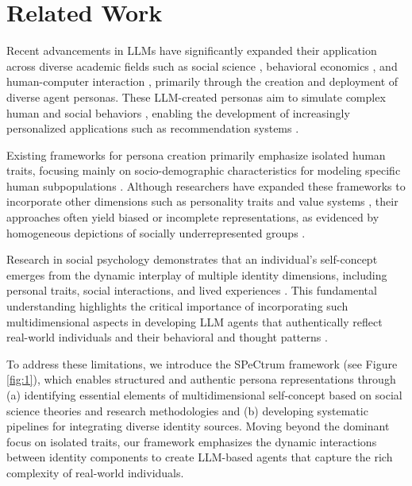 \section{Related Work}
Recent advancements in LLMs have significantly expanded their application across diverse academic fields such as social science \citep{aher_using_2023, gao_s3_2023}, behavioral economics \citep{horton_large_2023}, and human-computer interaction \citep{hamalainen_evaluating_2023}, primarily through the creation and deployment of diverse agent personas. These LLM-created personas aim to simulate complex human and social behaviors \citep{park_social_2022, park_generative_2023}, enabling the development of increasingly personalized applications such as recommendation systems \citep{wang_user_2023}.

Existing frameworks for persona creation primarily emphasize isolated human traits, focusing mainly on socio-demographic characteristics \citep{chen_empathy_2024, zhang_speechagents_2024, chuang-etal-2024-simulating} for modeling specific human subpopulations \citep{argyle_out_2023}. Although researchers have expanded these frameworks to incorporate other dimensions such as personality traits \citep{jiang-etal-2024-personallm, liu2024skepticism, xie_human_2024, yuan_evaluating_2024} and value systems \citep{zhou_sotopia_2024, xie2024largelanguagemodelagents, kang_values_2023}, their approaches often yield biased or incomplete representations, as evidenced by homogeneous depictions of socially underrepresented groups \citep{petrov_limited_2024, gupta_bias_2023, deusex_2024, cheng_compost_2023, lee_large_2024}.

Research in social psychology demonstrates that an individual's self-concept emerges from the dynamic interplay of multiple identity dimensions, including personal traits, social interactions, and lived experiences \citep{mead1934mind}. This fundamental understanding highlights the critical importance of incorporating such multidimensional aspects in developing LLM agents that authentically reflect real-world individuals and their behavioral and thought patterns \citep{xiao_how_2023}.

To address these limitations, we introduce the SPeCtrum framework (see Figure \ref{fig:1}), which enables structured and authentic persona representations through (a) identifying essential elements of multidimensional self-concept based on social science theories and research methodologies and (b) developing systematic pipelines for integrating diverse identity sources. Moving beyond the dominant focus on isolated traits, our framework emphasizes the dynamic interactions between identity components to create LLM-based agents that capture the rich complexity of real-world individuals.
